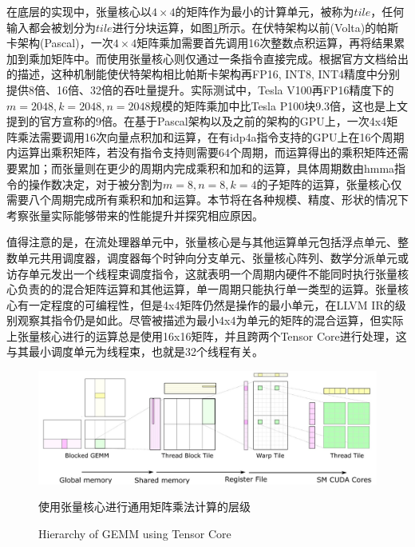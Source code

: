 \par 在底层的实现中，张量核心以$ 4 \times 4 $的矩阵作为最小的计算单元，被称为$ tile $，任何输入都会被划分为$ tile $进行分块运算，如图\ref{Fig.Tile}所示\cite{CUTLASS}。在伏特架构以前(Volta)的帕斯卡架构(Pascal)，一次$ 4 \times 4 $矩阵乘加需要首先调用16次整数点积运算，再将结果累加到乘加矩阵中。而使用张量核心则仅通过一条指令直接完成。根据官方文档给出的描述，这种机制能使伏特架构相比帕斯卡架构再FP16, INT8, INT4精度中分别提供8倍、16倍、32倍的吞吐量提升。实际测试中，Tesla V100再FP16精度下的$ m=2048, k=2048, n = 2048 $规模的矩阵乘加中比Tesla P100块9.3倍\cite{VOLTAWHITEPAPER}，这也是上文提到的官方宣称的9倍。在基于Pascal架构以及之前的架构的GPU上，一次4x4矩阵乘法需要调用16次向量点积加和运算，在有idp4a指令支持的GPU上在16个周期内运算出乘积矩阵，若没有指令支持则需要64个周期，而运算得出的乘积矩阵还需要累加；而张量则在更少的周期内完成乘积和加和的运算，具体周期数由hmma指令的操作数决定，对于被分割为$ m=8,n=8,k=4 $的子矩阵的运算，张量核心仅需要八个周期完成所有乘积和加和运算\cite{HMMA}。本节将在各种规模、精度、形状的情况下考察张量实际能够带来的性能提升并探究相应原因。
\par 值得注意的是，在流处理器单元中，张量核心是与其他运算单元包括浮点单元、整数单元共用调度器，调度器每个时钟向分支单元、张量核心阵列、数学分派单元或访存单元发出一个线程束调度指令，这就表明一个周期内硬件不能同时执行张量核心负责的的混合矩阵运算和其他运算，单一周期只能执行单一类型的运算\cite{AMPEREPOR}。张量核心有一定程度的可编程性，但是4x4矩阵仍然是操作的最小单元，在LLVM IR的级别观察其指令仍是如此。尽管被描述为最小4x4为单元的矩阵的混合运算，但实际上张量核心进行的运算总是使用16x16矩阵，并且跨两个Tensor Core进行处理\cite{TENSORCORE}，这与其最小调度单元为线程束，也就是32个线程有关。
\begin{figure}
	\centering
	\includegraphics[width=15cm]{figures/Tile.jpg}
	\renewcommand{\thefigure}{\arabic{section}-\arabic{figure} }
	\renewcommand{\figurename}{图}
	\caption{使用张量核心进行通用矩阵乘法计算的层级\cite{CUTLASS}}
	\addtocounter{figure}{-1}
	\renewcommand{\thefigure}{\arabic{section}-\arabic{figure} }
	\renewcommand{\figurename}{Figure}
	\caption{Hierarchy of GEMM using Tensor Core}
	\label{Fig.Tile}
\end{figure}

